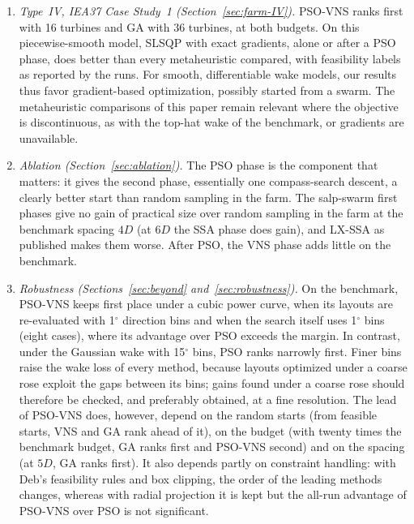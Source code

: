 \begin{enumerate}
\item \emph{Type~IV, IEA37 Case Study~1 (Section~\ref{sec:farm-IV}).} PSO-VNS ranks first with 16 turbines and GA with 36 turbines, at both budgets. On this piecewise-smooth model, SLSQP with exact gradients, alone or after a PSO phase, does better than every metaheuristic compared, with feasibility labels as reported by the runs. For smooth, differentiable wake models, our results thus favor gradient-based optimization, possibly started from a swarm. The metaheuristic comparisons of this paper remain relevant where the objective is discontinuous, as with the top-hat wake of the benchmark, or gradients are unavailable.
\item \emph{Ablation (Section~\ref{sec:ablation}).} The PSO phase is the component that matters: it gives the second phase, essentially one compass-search descent, a clearly better start than random sampling in the farm. The salp-swarm first phases give no gain of practical size over random sampling in the farm at the benchmark spacing $4D$ (at $6D$ the SSA phase does gain), and LX-SSA as published makes them worse. After PSO, the VNS phase adds little on the benchmark.
\item \emph{Robustness (Sections~\ref{sec:beyond} and~\ref{sec:robustness}).} On the benchmark, PSO-VNS keeps first place under a cubic power curve, when its layouts are re-evaluated with 1$^\circ$ direction bins and when the search itself uses 1$^\circ$ bins (eight cases), where its advantage over PSO exceeds the margin. In contrast, under the Gaussian wake with 15$^\circ$ bins, PSO ranks narrowly first. Finer bins raise the wake loss of every method, because layouts optimized under a coarse rose exploit the gaps between its bins; gains found under a coarse rose should therefore be checked, and preferably obtained, at a fine resolution. The lead of PSO-VNS does, however, depend on the random starts (from feasible starts, VNS and GA rank ahead of it), on the budget (with twenty times the benchmark budget, GA ranks first and PSO-VNS second) and on the spacing (at $5D$, GA ranks first). It also depends partly on constraint handling: with Deb's feasibility rules and box clipping, the order of the leading methods changes, whereas with radial projection it is kept but the all-run advantage of PSO-VNS over PSO is not significant.

\end{enumerate}
